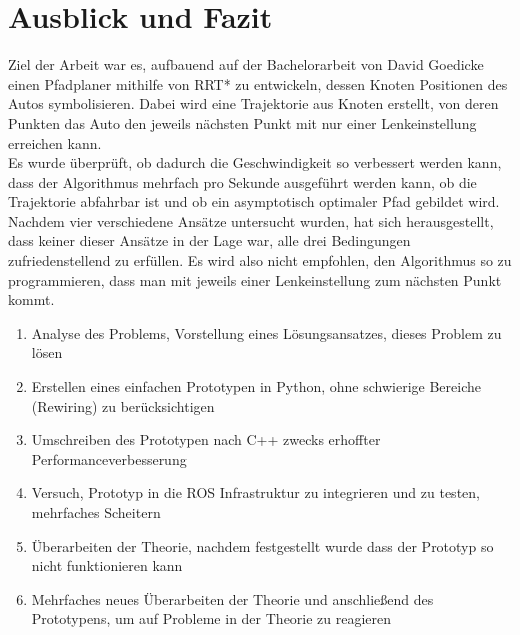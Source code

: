 \section{Ausblick und Fazit}
\label{sec:Zusammenfassung}
Ziel der Arbeit war es, aufbauend auf der Bachelorarbeit von David Goedicke \citep{Goedicke18} einen Pfadplaner mithilfe von RRT* zu entwickeln, dessen Knoten Positionen des Autos symbolisieren. Dabei wird eine Trajektorie aus Knoten erstellt, von deren Punkten das Auto den jeweils nächsten Punkt mit nur einer Lenkeinstellung erreichen kann. \\
Es wurde überprüft, ob dadurch die Geschwindigkeit so verbessert werden kann, dass der Algorithmus mehrfach pro Sekunde ausgeführt werden kann, ob die Trajektorie abfahrbar ist und ob ein asymptotisch optimaler Pfad gebildet wird. \\
Nachdem vier verschiedene Ansätze untersucht wurden, hat sich herausgestellt, dass keiner dieser Ansätze in der Lage war, alle drei Bedingungen zufriedenstellend zu erfüllen. Es wird also nicht empfohlen, den Algorithmus so zu programmieren, dass man mit jeweils einer Lenkeinstellung zum nächsten Punkt kommt.

\begin{enumerate}
\item Analyse des Problems, Vorstellung eines Lösungsansatzes, dieses Problem zu lösen
\item Erstellen eines einfachen Prototypen in Python, ohne schwierige Bereiche (Rewiring) zu berücksichtigen
\item Umschreiben des Prototypen nach C++ zwecks erhoffter Performanceverbesserung
\item Versuch, Prototyp in die ROS Infrastruktur zu integrieren und zu testen, mehrfaches Scheitern
\item Überarbeiten der Theorie, nachdem festgestellt wurde dass der Prototyp so nicht funktionieren kann
\item Mehrfaches neues Überarbeiten der Theorie und anschließend des Prototypens, um auf Probleme in der Theorie zu reagieren
\end{enumerate}


